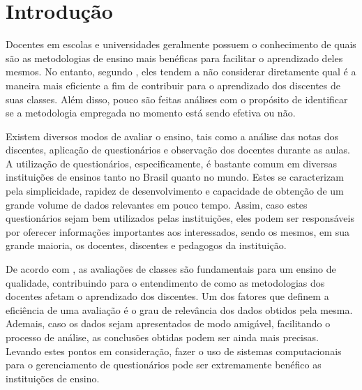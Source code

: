 \documentclass[
  12pt,       %
  openright,      %
  oneside,      %
  a4paper,      %
  english,      %
  french,        %
  spanish,     %
  brazil        %
  ]{abntex2-decsi}
\begin{document}
\tableofcontents*
\cleardoublepage

\textual

\chapter[Introdução]{Introdução}

Docentes em escolas e universidades geralmente possuem o conhecimento de quais são as metodologias de ensino mais benéficas para facilitar o aprendizado deles mesmos. No entanto, segundo , eles tendem a não considerar diretamente qual é a maneira mais eficiente a fim de contribuir para o aprendizado dos discentes de suas classes. Além disso, pouco são feitas análises com o propósito de identificar se a metodologia empregada no momento está sendo efetiva ou não. 

Existem diversos modos de avaliar o ensino, tais como a análise das notas dos discentes, aplicação de questionários e observação dos docentes durante as aulas. A utilização de questionários, especificamente, é bastante comum em diversas instituições de ensinos tanto no Brasil quanto no mundo. Estes se caracterizam pela simplicidade, rapidez de desenvolvimento e capacidade de obtenção de um grande volume de dados relevantes em pouco tempo. Assim, caso estes questionários sejam bem utilizados pelas instituições, eles podem ser responsáveis por oferecer informações importantes aos interessados, sendo os mesmos, em sua grande maioria, os docentes, discentes e pedagogos da instituição.

De acordo com , as avaliações de classes são fundamentais para um ensino de qualidade, contribuindo para o entendimento de como as metodologias dos docentes afetam o aprendizado dos discentes. Um dos fatores que definem a eficiência de uma avaliação é o grau de relevância dos dados obtidos pela mesma. Ademais, caso os dados sejam apresentados de modo amigável, facilitando o processo de análise, as conclusões obtidas podem ser ainda mais precisas. Levando estes pontos em consideração, fazer o uso de sistemas computacionais para o gerenciamento de questionários pode ser extremamente benéfico as instituições de ensino.
\end{document}
